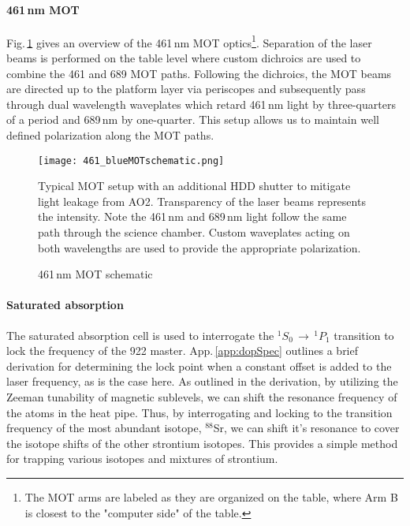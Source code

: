 \paragraph{461\,nm MOT}
Fig.\,\ref{fig:blueMOTSchematic} gives an overview of the 461\,nm MOT optics\footnote{The MOT arms are labeled as they are organized on the table, where Arm B is closest to the "computer side" of the table.}.
Separation of the laser beams is performed on the table level where custom dichroics are used to combine the 461 and 689 MOT paths.
Following the dichroics, the MOT beams are directed up to the platform layer via periscopes and subsequently pass through dual wavelength waveplates which retard 461\,nm light by three-quarters of a period and 689\,nm by one-quarter.
This setup allows us to maintain well defined polarization along the MOT paths.
	\begin{figure} 
		\centerline{
		\texttt{[image: 461\_blueMOTschematic.png]}}
		\caption{461\,nm MOT schematic}{Typical MOT setup with an additional HDD shutter to mitigate light leakage from AO2. Transparency of the laser beams represents the intensity. Note the 461\,nm and 689\,nm light follow the same path through the science chamber. Custom waveplates acting on both wavelengths are used to provide the appropriate polarization.}
		\label{fig:blueMOTSchematic}
	\end{figure}


\paragraph{Saturated absorption}
The saturated absorption cell is used to interrogate the $^1S_0\,\rightarrow\,^1P_1$ transition to lock the frequency of the 922 master.
App.\,\ref{app:dopSpec} outlines a brief derivation for determining the lock point when a constant offset is added to the laser frequency, as is the case here.
As outlined in the derivation, by utilizing the Zeeman tunability of magnetic sublevels, we can shift the resonance frequency of the atoms in the heat pipe.
Thus, by interrogating and locking to the transition frequency of the most abundant isotope, $^{88}$Sr, we can shift it's resonance to cover the isotope shifts of the other strontium isotopes.
This provides a simple method for trapping various isotopes and mixtures of strontium.

